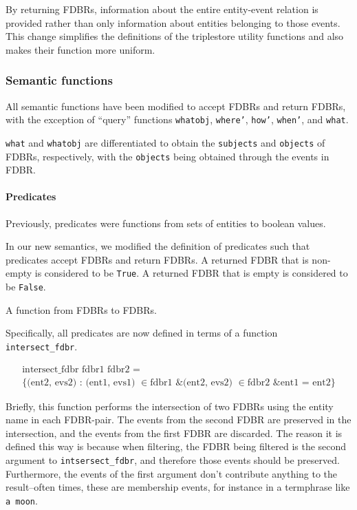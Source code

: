 \documentclass[../main.tex]{subfiles}
\begin{document}
By returning FDBRs, information about the entire entity-event relation is provided rather than only information about entities
belonging to those events.  This change simplifies the definitions of the triplestore utility functions and also makes their function
more uniform.


\subsubsection{Semantic functions}

All semantic functions have been modified to accept FDBRs and return FDBRs, with the exception of ``query'' functions
\texttt{whatobj}, \texttt{where'}, \texttt{how'}, \texttt{when'}, and \texttt{what}.

\texttt{what} and \texttt{whatobj} are differentiated to obtain the \texttt{subjects} and \texttt{objects} of FDBRs, respectively, with the
\texttt{objects} being obtained through the events in FDBR. 

\paragraph{Predicates}
Previously, predicates were functions from sets of entities to boolean values.

In our new semantics, we modified the definition of predicates such that predicates accept FDBRs and return FDBRs.  A returned FDBR that is non-empty is 
considered to be \texttt{True}.  A returned FDBR that is empty is considered to be \texttt{False}.

\begin{definition}[Predicate]
	A function from FDBRs to FDBRs.
\end{definition}

Specifically, all predicates are now defined in terms of a function \texttt{intersect\_fdbr}.

\begin{definition}
	\begin{multline}
	\text{intersect\_fdbr fdbr1 fdbr2 = } \\ \{\text{(ent2, evs2) : (ent1, evs1) }\in \text{fdbr1 \& (ent2, evs2) } \in \text{fdbr2 \& ent1 = ent2}\}
	\end{multline}
\end{definition}

Briefly, this function performs the intersection of two FDBRs using the entity name in each FDBR-pair.  The events from the second FDBR are preserved
in the intersection, and the events from the first FDBR are discarded.  The reason it is defined this way is because when filtering, the FDBR being filtered
is the second argument to \texttt{intsersect\_fdbr}, and therefore those events should be preserved.  Furthermore, the events of the first argument
don't contribute anything to the result--often times, these are membership events, for instance in a termphrase like \texttt{a moon}.
\end{document}
